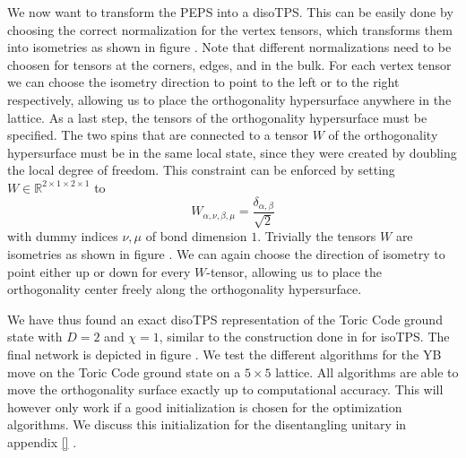 We now want to transform the PEPS into a disoTPS. This can be easily done by choosing the correct normalization for the vertex tensors, which transforms them into isometries as shown in figure . Note that different normalizations need to be choosen for tensors at the corners, edges, and in the bulk. For each vertex tensor we can choose the isometry direction to point to the left or to the right respectively, allowing us to place the orthogonality hypersurface anywhere in the lattice. As a last step, the tensors of the orthogonality hypersurface must be specified. The two spins that are connected to a tensor $W$ of the orthogonality hypersurface must be in the same local state, since they were created by doubling the local degree of freedom. This constraint can be enforced by setting $W\in\mathbb{R}^{2\times1\times2\times1}$ to
\begin{equation}
	W_{\alpha,\nu,\beta,\mu} = \frac{\delta_{\alpha,\beta}}{\sqrt{2}}
\end{equation} 
with dummy indices $\nu, \mu$ of bond dimension $1$. Trivially the tensors $W$ are isometries as shown in figure . We can again choose the direction of isometry to point either up or down for every $W$-tensor, allowing us to place the orthogonality center freely along the orthogonality hypersurface.\par
We have thus found an exact disoTPS representation of the Toric Code ground state with $D = 2$ and $\chi= 1$, similar to the construction done in \cite{cite:isometric_tensor_network_representation_of_string_net_liquids} for isoTPS. The final network is depicted in figure . We test the different algorithms for the YB move on the Toric Code ground state on a $5\times5$ lattice. All algorithms are able to move the orthogonality surface exactly up to computational accuracy. This will however only work if a good initialization is chosen for the optimization algorithms. We discuss this initialization for the disentangling unitary in appendix \ref{} .